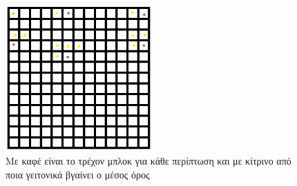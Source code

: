 \begin{figure}[ht]
  \centering
  \includegraphics[width=0.5\textwidth]{chapter4/grid.png}
  \caption{Με καφέ είναι το τρέχον μπλοκ για κάθε περίπτωση και με κίτρινο από ποια γειτονικά βγαίνει ο μέσος όρος}
  \label{fig:averenergy}
\end{figure}

